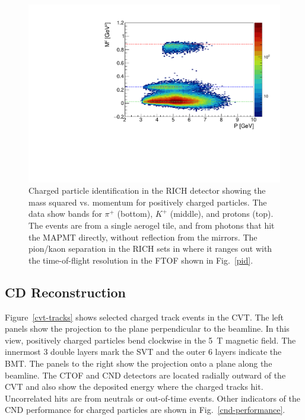 \documentclass[final,3p,twocolumn]{elsarticle}
\begin{document}
\begin{figure}[ht!]
\centerline{\includegraphics[width=1.0\columnwidth]{mass_min3.pdf}}
\caption{Charged particle identification in the RICH detector showing the mass squared vs. momentum for positively
  charged particles. The data show bands for $\pi^+$ (bottom), $K^+$ (middle), and protons (top). The events are
  from a single aerogel tile, and from photons that hit the MAPMT directly, without reflection from the mirrors. The
  pion/kaon separation in the RICH sets in where it ranges out with the time-of-flight resolution in the FTOF shown
  in Fig.~\ref{pid}.}
\label{rich_rec}
\end{figure}

\subsection{CD Reconstruction}

Figure~\ref{cvt-tracks} shows selected charged track events in the CVT. The left panels show the projection to
the plane perpendicular to the beamline. In this view, positively charged particles bend clockwise in the 5~T
magnetic field. The innermost 3 double layers mark the SVT and the outer 6 layers indicate the BMT. The panels to
the right show the projection onto a plane along the beamline. The CTOF and CND detectors are located radially
outward of the CVT and also show the deposited energy where the charged tracks hit. Uncorrelated hits are from
neutrals or out-of-time events. Other indicators of the CND performance for charged particles are shown in
Fig.~\ref{cnd-performance}.  
\end{document}
